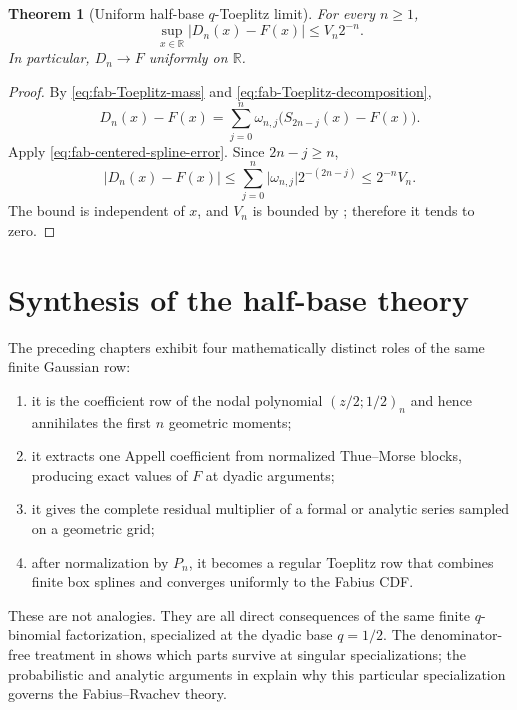 \documentclass[11pt,oneside,openany]{book}
\newtheorem{theorem}{Theorem}[chapter]
\theoremstyle{definition}
\theoremstyle{remark}
\newcommand{\R}{\mathbb R}
\newcommand{\abs}[1]{\lvert #1\rvert}
\begin{document}
\begin{theorem}[Uniform half-base \texorpdfstring{$q$}{q}-Toeplitz limit]
\label{thm:fab-Toeplitz-limit}
For every $n\ge1$,
\begin{equation}
 \sup_{x\in\R}\abs{D_n(x)-F(x)}
 \le V_n2^{-n}.
 \label{eq:fab-Toeplitz-error}
\end{equation}
In particular, $D_n\to F$ uniformly on $\R$.
\end{theorem}

\begin{proof}
By \eqref{eq:fab-Toeplitz-mass} and
\eqref{eq:fab-Toeplitz-decomposition},
\[
 D_n(x)-F(x)
 =\sum_{j=0}^{n}\omega_{n,j}
  \bigl(S_{2n-j}(x)-F(x)\bigr).
\]
Apply \eqref{eq:fab-centered-spline-error}.  Since $2n-j\ge n$,
\[
 \abs{D_n(x)-F(x)}
 \le\sum_{j=0}^{n}\abs{\omega_{n,j}}2^{-(2n-j)}
 \le2^{-n}V_n.
\]
The bound is independent of $x$, and $V_n$ is bounded by
; therefore it tends to zero.
\end{proof}

\section{Synthesis of the half-base theory}

The preceding chapters exhibit four mathematically distinct roles of the
same finite Gaussian row:
\begin{enumerate}
\item it is the coefficient row of the nodal polynomial
$(z/2;1/2)_n$ and hence annihilates the first $n$ geometric moments;
\item it extracts one Appell coefficient from normalized Thue--Morse blocks,
producing exact values of $F$ at dyadic arguments;
\item it gives the complete residual multiplier of a formal or analytic
series sampled on a geometric grid;
\item after normalization by $P_n$, it becomes a regular Toeplitz row that
combines finite box splines and converges uniformly to the Fabius CDF.
\end{enumerate}
These are not analogies.  They are all direct consequences of the same
finite $q$-binomial factorization, specialized at the dyadic base
$q=1/2$.  The denominator-free treatment in
 shows which parts survive at singular
specializations; the probabilistic and analytic arguments in
 explain why this
particular specialization governs the Fabius--Rvachev theory.
\end{document}
